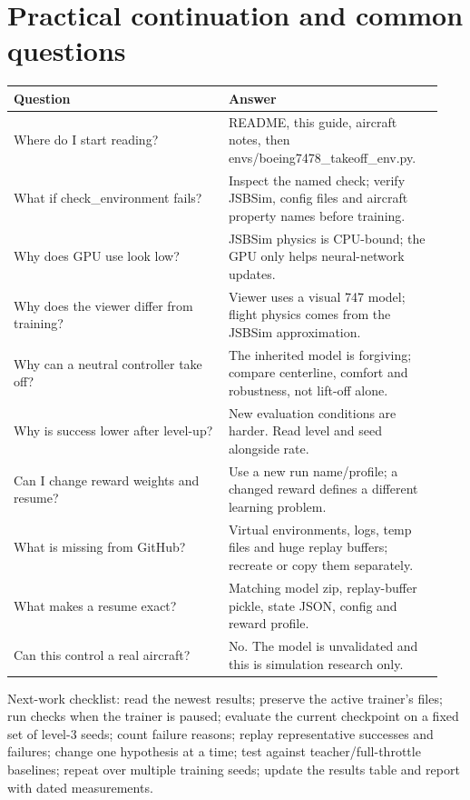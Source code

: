 \documentclass[11pt,a4paper]{article}
\begin{document}
\section{Practical continuation and common questions}
\begin{longtable}{|p{0.47\linewidth}|p{0.47\linewidth}|}\hline
Question & Answer \\ \hline
Where do I start reading? & README, this guide, aircraft notes, then envs/boeing7478\_takeoff\_env.py. \\ \hline
What if check\_environment fails? & Inspect the named check; verify JSBSim, config files and aircraft property names before training. \\ \hline
Why does GPU use look low? & JSBSim physics is CPU-bound; the GPU only helps neural-network updates. \\ \hline
Why does the viewer differ from training? & Viewer uses a visual 747 model; flight physics comes from the JSBSim approximation. \\ \hline
Why can a neutral controller take off? & The inherited model is forgiving; compare centerline, comfort and robustness, not lift-off alone. \\ \hline
Why is success lower after level-up? & New evaluation conditions are harder. Read level and seed alongside rate. \\ \hline
Can I change reward weights and resume? & Use a new run name/profile; a changed reward defines a different learning problem. \\ \hline
What is missing from GitHub? & Virtual environments, logs, temp files and huge replay buffers; recreate or copy them separately. \\ \hline
What makes a resume exact? & Matching model zip, replay-buffer pickle, state JSON, config and reward profile. \\ \hline
Can this control a real aircraft? & No. The model is unvalidated and this is simulation research only. \\ \hline
\end{longtable}
Next-work checklist: read the newest results; preserve the active trainer's files; run checks when the trainer is paused; evaluate the current checkpoint on a fixed set of level-3 seeds; count failure reasons; replay representative successes and failures; change one hypothesis at a time; test against teacher/full-throttle baselines; repeat over multiple training seeds; update the results table and report with dated measurements.
\end{document}
